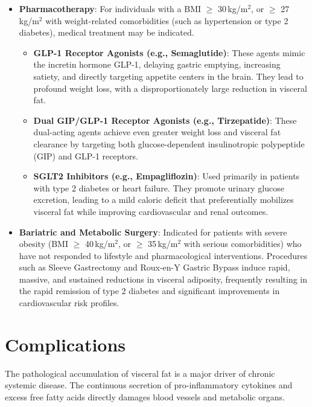 \begin{itemize}
    \textbf{Alcohol Cessation}: Eliminating or severely restricting alcohol consumption is vital. Alcohol contains empty calories and is prioritized by the liver for metabolism, which suppresses lipid oxidation and promotes the synthesis of visceral and hepatic fat (contributing to the ``beer belly'' phenotype).
    \item \textbf{Pharmacotherapy}: For individuals with a BMI $\ge$ 30\,kg/m$^2$, or $\ge$ 27\,kg/m$^2$ with weight-related comorbidities (such as hypertension or type 2 diabetes), medical treatment may be indicated.
    \begin{itemize}
        \item \textbf{GLP-1 Receptor Agonists (e.g., Semaglutide)}: These agents mimic the incretin hormone GLP-1, delaying gastric emptying, increasing satiety, and directly targeting appetite centers in the brain. They lead to profound weight loss, with a disproportionately large reduction in visceral fat.
        \item \textbf{Dual GIP/GLP-1 Receptor Agonists (e.g., Tirzepatide)}: These dual-acting agents achieve even greater weight loss and visceral fat clearance by targeting both glucose-dependent insulinotropic polypeptide (GIP) and GLP-1 receptors.
        \item \textbf{SGLT2 Inhibitors (e.g., Empagliflozin)}: Used primarily in patients with type 2 diabetes or heart failure. They promote urinary glucose excretion, leading to a mild caloric deficit that preferentially mobilizes visceral fat while improving cardiovascular and renal outcomes.
    \end{itemize}
    \item \textbf{Bariatric and Metabolic Surgery}: Indicated for patients with severe obesity (BMI $\ge$ 40\,kg/m$^2$, or $\ge$ 35\,kg/m$^2$ with serious comorbidities) who have not responded to lifestyle and pharmacological interventions. Procedures such as Sleeve Gastrectomy and Roux-en-Y Gastric Bypass induce rapid, massive, and sustained reductions in visceral adiposity, frequently resulting in the rapid remission of type 2 diabetes and significant improvements in cardiovascular risk profiles.
\end{itemize}

\section*{Complications}
The pathological accumulation of visceral fat is a major driver of chronic systemic disease. The continuous secretion of pro-inflammatory cytokines and excess free fatty acids directly damages blood vessels and metabolic organs.

